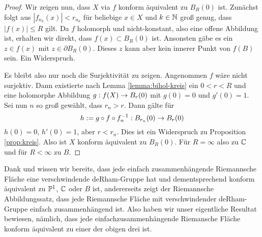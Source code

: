 \begin{proof}
  Wir zeigen nun, dass $X$ via $f$ konform äquivalent zu $B_R(0)$ ist.
  Zunächst folgt aus $|f_{n_k}(x)| < r_{n_k}$ für beliebige $x \in X$
  und $k \in \N$ groß genug, dass $|f(x)| \leq R$ gilt. Da $f$
  holomorph und nicht-konstant, also eine offene Abbildung ist, erhalten wir direkt,
  dass $f(x) \subset B_R(0)$ ist. Ansonsten gäbe es ein $z \in f(x)$ mit
  $z \in \partial B_R(0)$. Dieses $z$ kann aber kein innerer Punkt von
  $f(B)$ sein. Ein Widerspruch. 

  Es bleibt also nur noch die Surjektivität zu zeigen. 
  Angenommen $f$ wäre nicht surjektiv. Dann existierte nach Lemma
  \ref{lemma:bihol-kreis} ein $0 < r < R$ und eine holomorphe
  Abbildung $g: f(X) \ra B_r(0)$ mit $g(0) = 0$ und $g'(0) = 1$. 
  Sei nun $n$ so groß gewählt, dass $r_n > r$. Dann gälte für
  \[
  h:= g \circ f \circ f^{-1}_n : B_{r_n}(0) \ra B_r(0)
  \]
  $h(0)=0$, $h'(0) = 1$, aber $r < r_n$. Dies ist ein Widerspruch zu
  Proposition \ref{prop:kreis}. 
  Also ist $X$ konform äquivalent zu $B_R(0)$. Für $R = \infty$ also
  zu $\C$ und für $R < \infty$ zu $B$.
\end{proof}

\begin{rem}
  Dank \cite[Kor.16]{For} und \cite[Kor.10.7]{For} wissen wir bereits,
  dass jede einfach zusammenhängende Riemannsche
  Fläche eine verschwindende deRham-Gruppe hat und dementsprechend
  konform äquivalent zu $\P^1$, $\C$ oder $B$ ist, andererseits zeigt
  der Riemannsche Abbildungssatz, dass jede Riemannsche Fläche mit
  verschwindender deRham-Gruppe einfach zusammenhängend ist. Also
  haben wir unser eigentliche Resultat bewiesen, nämlich, dass jede
  einfachzusammenhängende Riemansche Fläche konform äquivalent zu
  einer der obigen drei ist.
\end{rem}

